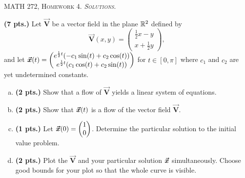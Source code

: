 \documentclass[12pt]{article} %
\newcommand{\vecfieldV}{\boldsymbol{\vec{V}}}
\begin{document}
\begin{center}
   \textsc{\large MATH 272, Homework 4. \emph{Solutions}.}\\
\end{center}
\vspace{.5cm}


\begin{problem}
\textbf{(7 pts.)} Let $\vecfieldV$ be a vector field in the plane $\mathbb{R}^2$ defined by
\[
\vecfieldV(x,y) = \begin{pmatrix} \frac{1}{2}x-y \\ x + \frac{1}{2}y \end{pmatrix},
\]
and let $\boldsymbol{\vec{x}}(t) = \begin{pmatrix}  e^{\frac{1}{2}t} (-c_1 \sin(t) + c_2 \cos(t) ) \\ e^{\frac{1}{2}t} (c_1 \cos(t) + c_2 \sin(t)) \end{pmatrix}$ for $t\in [0,\pi]$ where $c_1$ and $c_2$ are yet undetermined constants.
\begin{enumerate}[(a)]
    \item \textbf{(2 pts.)} Show that a flow of $\vecfieldV$ yields a linear system of equations.
    \item \textbf{(2 pts.)} Show that $\boldsymbol{\vec{x}}(t)$ is a flow of the vector field $\vecfieldV$.
    \item \textbf{(1 pts.)} Let $\boldsymbol{\vec{x}}(0)=\begin{pmatrix} 1 \\ 0 \end{pmatrix}$. Determine the particular solution to the initial value problem.
    \item \textbf{(2 pts.)} Plot the $\vecfieldV$ and your particular solution $\boldsymbol{\vec{x}}$ simultaneously. Choose good bounds for your plot so that the whole curve is visible.
\end{enumerate}
\end{problem}
\end{document}
